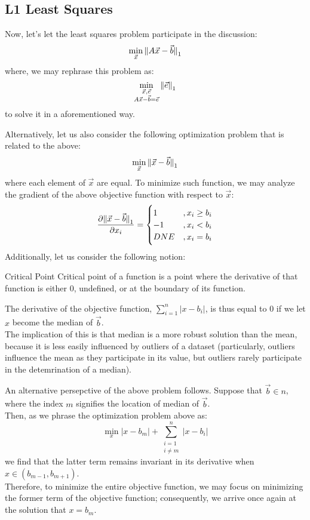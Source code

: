 \subsection{L1 Least Squares}
Now, let's let the least squares problem participate in the discussion:
\[
    \min_{\vec{x}} {\| A \vec{x} - \vec{b} \|}_{1}^{}
\]
where, we may rephrase this problem as:
\[
    \min_{
        \substack{
            \vec{x}, \vec{e} \\
            A\vec{x} - \vec{b} = \vec{e}
        }
    } {\| \vec{e} \|}_{1}^{}
\]
to solve it in a aforementioned way.

Alternatively, let us also consider the following optimization problem that is related to the above:
\[
    \min_{\vec{x}} {\| \vec{x} - \vec{b} \|}_{1}^{}
\]
where each element of $\vec{x}$ are equal.
To minimize such function, we may analyze the gradient of the above objective function with respect to $\vec{x}$:
\[
    \pdv{{\| \vec{x} - \vec{b} \|}_{1}^{}}{x_i} =
    \begin{cases}
        1 &, x_i \geq b_i \\
        -1 &, x_i < b_i \\
        DNE &, x_i = b_i
    \end{cases}
\]
Additionally, let us consider the following notion:
\begin{ln-define}{Critical Point}{}
    Critical point of a function is a point where the derivative of that function is either $0$, undefined, or at the boundary of its function.
\end{ln-define}
The derivative of the objective function, $\sum_{i = 1}^n |x - b_i|$, is thus equal to $0$ if we let $x$ become the median of $\vec{b}$. \\
The implication of this is that median is a more robust solution than the mean, because it is less easily influenced by outliers of a dataset (particularly, outliers influence the mean as they participate in its value, but outliers rarely participate in the detemrination of a median).

An alternative persepctive of the above problem follows. Suppose that $\vec{b} \in n$, where the index $m$ signifies the location of median of $\vec{b}$. \\
Then, as we phrase the optimization problem above as:
\[
    \min_{x} |x - b_m| + \sum_{\substack{i = 1 \\ i \neq m}}^n |x - b_i|
\]
we find that the latter term remains invariant in its derivative when $x \in (b_{m - 1}, b_{m + 1})$. \\
Therefore, to minimize the entire objective function, we may focus on minimizing the former term of the objective function; consequently, we arrive once again at the solution that $x = b_m$.


